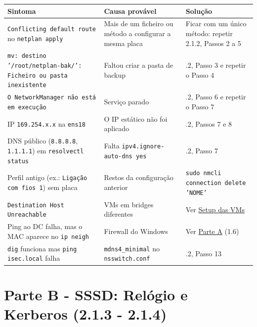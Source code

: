 \begin{center}\small
\begin{tabularx}{\linewidth}{|>{\raggedright\arraybackslash}X|>{\raggedright\arraybackslash}X|>{\raggedright\arraybackslash}X|}
\hline
\rowcolor{azul!10}\textbf{Sintoma} & \textbf{Causa provável} & \textbf{Solução} \\
\hline
\texttt{Conflicting default route} no \texttt{netplan apply} & Mais de um ficheiro ou método a configurar a mesma placa & Ficar com um único método: repetir 2.1.2, Passos 2 a 5 \\
\hline
\texttt{mv: destino '/\allowbreak{}root/\allowbreak{}netplan-bak/\allowbreak{}': Ficheiro ou pasta inexistente} & Faltou criar a pasta de backup & 2.1.2, Passo 3 e repetir o Passo 4 \\
\hline
\texttt{O NetworkManager não está em execução} & Serviço parado & 2.1.2, Passo 6 e repetir o Passo 7 \\
\hline
IP \texttt{169.254.x.x} na \texttt{ens18} & O IP estático não foi aplicado & 2.1.2, Passos 7 e 8 \\
\hline
DNS público (\texttt{8.8.8.8}, \texttt{1.1.1.1}) em \texttt{resolvectl status} & Falta \texttt{ipv4.ignore-auto-dns yes} & 2.1.2, Passo 7 \\
\hline
Perfil antigo (ex.: \texttt{Ligação com fios 1}) sem placa & Restos da configuração anterior & \texttt{sudo nmcli connection delete 'NOME'} \\
\hline
\texttt{Destination Host Unreachable} & VMs em bridges diferentes & Ver \hyperref[ec-setup]{Setup das VMs} \\
\hline
Ping ao DC falha, mas o MAC aparece no \texttt{ip neigh} & Firewall do Windows & Ver \hyperref[ec-a]{Parte A} (1.6) \\
\hline
\texttt{dig} funciona mas \texttt{ping isec.local} falha & \texttt{mdns4\_minimal} no \texttt{nsswitch.conf} & 2.1.2, Passo 13 \\
\hline
\end{tabularx}
\end{center}

\label{ec-b1-kerberos}

\section*{Parte B - SSSD: Relógio e Kerberos (2.1.3 - 2.1.4)}

